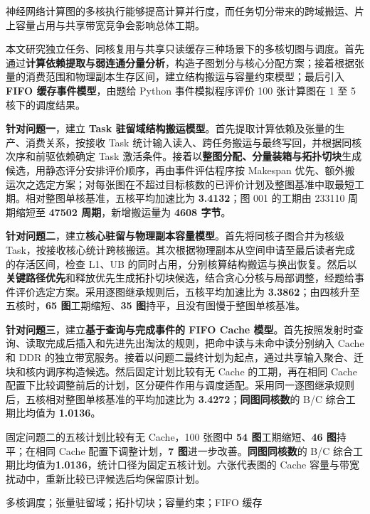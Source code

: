 \noindent\hspace*{2em}神经网络计算图的多核执行能够提高计算并行度，而任务切分带来的跨域搬运、片上容量占用与共享带宽竞争会影响总体工期。

本文研究独立任务、同核复用与共享只读缓存三种场景下的多核切图与调度。首先通过\textbf{计算依赖提取与弱连通分量分析}，构造子图划分与核心分配方案；接着根据张量的消费范围和物理副本生存区间，建立结构搬运与容量约束模型；最后引入 \textbf{FIFO 缓存事件模型}，由题给 Python 事件模拟程序评价 100 张计算图在 1 至 5 核下的调度结果。

\textbf{针对问题一}，建立 \textbf{Task 驻留域结构搬运模型}。首先提取计算依赖及张量的生产、消费关系，按接收 Task 统计输入读入、跨任务搬运与最终写回，并根据同核次序和前驱依赖确定 Task 激活条件。接着以\textbf{整图分配、分量装箱与拓扑切块}生成候选，用静态评分安排评价顺序，再由事件评估程序按 Makespan 优先、额外搬运次之选定方案；对每张图在不超过目标核数的已评价计划及整图基准中取最短工期。相对整图单核基准，五核平均加速比为 \textbf{3.4132}；图 001 的工期由 233110 周期缩短至 \textbf{47502 周期}，新增搬运量为 \textbf{4608 字节}。

\textbf{针对问题二}，建立\textbf{核心驻留与物理副本容量模型}。首先将同核子图合并为核级 Task，按接收核心统计跨核搬运。其次根据物理副本从空间申请至最后读者完成的存活区间，检查 L1、UB 的同时占用，分别核算结构搬运与换出恢复。然后以\textbf{关键路径优先}和释放优先生成拓扑切块候选，结合贪心分核与局部调整，经题给事件评价选定方案。采用逐图继承规则后，五核平均加速比为 \textbf{3.3862}；由四核升至五核时，\textbf{65 图}工期缩短、\textbf{35 图}持平，且没有图慢于整图单核基准。

\textbf{针对问题三}，建立\textbf{基于查询与完成事件的 FIFO Cache 模型}。首先按照发射时查询、读取完成后插入和先进先出淘汰的规则，把命中读与未命中读分别纳入 Cache 和 DDR 的独立带宽服务。接着以问题二最终计划为起点，通过共享输入聚合、迁块和核内调序构造候选。然后固定计划比较有无 Cache 的工期，再在相同 Cache 配置下比较调整前后的计划，区分硬件作用与调度适配。采用同一逐图继承规则后，五核相对整图单核基准的平均加速比为 \textbf{3.4272}；\textbf{同图同核数}的 B/C 综合工期比均值为 \textbf{1.0136}。

固定问题二的五核计划比较有无 Cache，100 张图中 \textbf{54 图}工期缩短、\textbf{46 图}持平；在相同 Cache 配置下调整计划，\textbf{7 图}进一步改善。\textbf{同图同核数}的 B/C 综合工期比均值为\textbf{1.0136}，统计口径为固定五核计划。六张代表图的 Cache 容量与带宽扰动中，重新比较已评候选后均保留原计划。

多核调度；张量驻留域；拓扑切块；容量约束；FIFO 缓存
